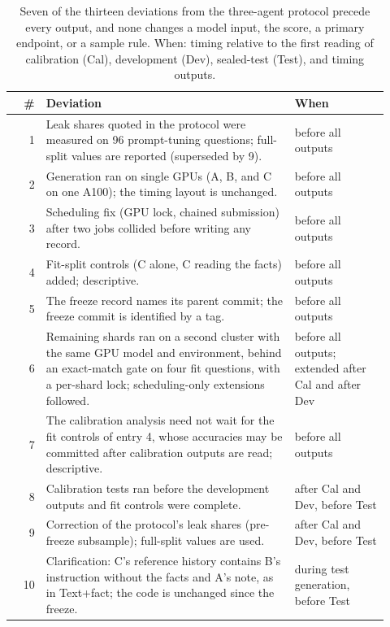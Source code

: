 \begin{table}[!htbp]\centering\scriptsize
\caption{Seven of the thirteen deviations from the three-agent protocol precede every output, and none changes a model input, the score, a primary endpoint, or a sample rule. When: timing relative to the first reading of calibration (Cal), development (Dev), sealed-test (Test), and timing outputs.}
\label{tab:e1_deviations}
\renewcommand{\arraystretch}{1.1}\setlength{\tabcolsep}{2.5pt}
\begin{tabular*}{\linewidth}{@{}r@{\hspace{5pt}}p{0.66\linewidth}@{\extracolsep{\fill}}p{0.255\linewidth}@{}}\toprule
\# & Deviation & When\\\midrule
1 & Leak shares quoted in the protocol were measured on 96 prompt-tuning questions; full-split values are reported (superseded by 9). & before all outputs\\
2 & Generation ran on single GPUs (A, B, and C on one A100); the timing layout is unchanged. & before all outputs\\
3 & Scheduling fix (GPU lock, chained submission) after two jobs collided before writing any record. & before all outputs\\
4 & Fit-split controls (C alone, C reading the facts) added; descriptive. & before all outputs\\
5 & The freeze record names its parent commit; the freeze commit is identified by a tag. & before all outputs\\
6 & Remaining shards ran on a second cluster with the same GPU model and environment, behind an exact-match gate on four fit questions, with a per-shard lock; scheduling-only extensions followed. & before all outputs; extended after Cal and after Dev\\
7 & The calibration analysis need not wait for the fit controls of entry 4, whose accuracies may be committed after calibration outputs are read; descriptive. & before all outputs\\
8 & Calibration tests ran before the development outputs and fit controls were complete. & after Cal and Dev, before Test\\
9 & Correction of the protocol's leak shares (pre-freeze subsample); full-split values are used. & after Cal and Dev, before Test\\
10 & Clarification: C's reference history contains B's instruction without the facts and A's note, as in Text+fact; the code is unchanged since the freeze. & during test generation, before Test\\

\end{tabular*}
\end{table}
